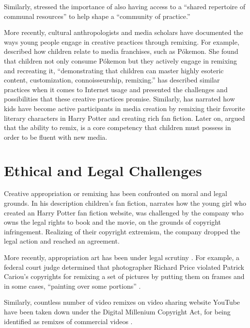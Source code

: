 Similarly, \citet{wenger_communities_1998} stressed the importance of also having access to a ``shared repertoire of communal resources'' to help shape a ``community of practice.''

More recently, cultural anthropologists and media scholars have documented the ways young people engage in creative practices through remixing. 
For example, \citet{ito_technologies_2007} described how children relate to media franchises, such as Pókemon.
She found that children not only consume Pókemon but they actively engage in remixing and recreating it, ``demonstrating that children can master highly esoteric content, customization, connoisseurship, remixing.''
\citet{livingstone_taking_2008} has described similar practices when it comes to Internet usage and presented the challenges and possibilities that these creative practices promise.
Similarly, \citet{jenkins_convergence_2006} has narrated how kids have become active participants in media creation by remixing their favorite literary characters in Harry Potter and creating rich fan fiction.
Later on, \citet{jenkins_confronting_2009} argued that the ability to remix, is a core competency that children must possess in order to be fluent with new media.

\section{Ethical and Legal Challenges}

Creative appropriation or remixing has been confronted on moral and legal grounds.
In his description children's fan fiction, \citet{jenkins_convergence_2006} narrates how the young girl who created an Harry Potter fan fiction website, was challenged by the company who owns the legal rights to book and the movie, on the grounds of copyright infringement.
Realizing of their copyright extremism, the company dropped the legal action and reached an agreement.

More recently, appropriation art has been under legal scrutiny \citep{greenberg_art_1992,landes_copyright_2000}. 
For example, a federal court judge determined that photographer Richard Price violated Patrick Cariou’s copyrights for remixing a set of pictures by putting them on frames and in some cases, ``painting over some portions'' \citep{batts_patrick_2011}.

Similarly, countless number of video remixes on video sharing website YouTube have been taken down under the Digital Millenium Copyright Act, for being identified as remixes of commercial videos \citep{seneviratne_remix_2010}.

